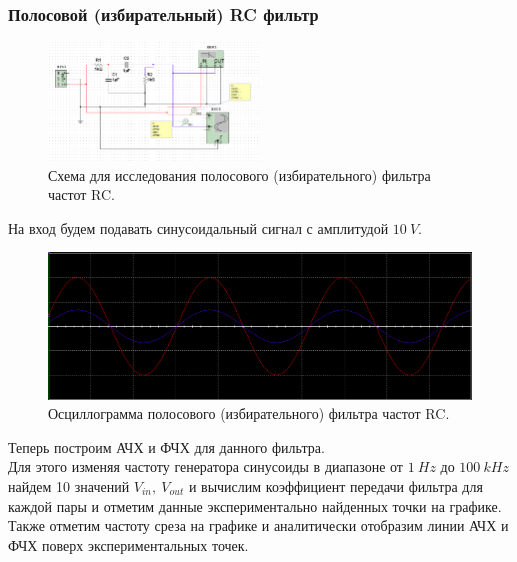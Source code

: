 \documentclass[12pt]{article}
\begin{document}
\subsubsection*{Полосовой (избирательный) RC фильтр}
\begin{figure}[H]
    \centering
    \includegraphics[width=0.5\textwidth]{3_scheme.png}
    \caption{Схема для исследования полосового (избирательного) фильтра частот RC.}
    \label{fig:3_scheme}
\end{figure}

На вход будем подавать синусоидальный сигнал с амплитудой $10 \ V$. \\

\begin{figure}[H]
    \centering
    \includegraphics[width=\textwidth]{3_osc.png}
    \caption{Осциллограмма полосового (избирательного) фильтра частот RC.}
    \label{fig:3_osc}
\end{figure}

Теперь построим АЧХ и ФЧХ для данного фильтра. \\
Для этого изменяя частоту генератора синусоиды в диапазоне от $1 \ Hz$ до $100 \ kHz$ найдем 10 значений $V_{in}, \ V_{out}$ и вычислим коэффициент передачи фильтра для каждой пары и отметим данные экспериментально найденных точки на графике. \\
Также отметим частоту среза на графике и аналитически отобразим линии АЧХ и ФЧХ поверх экспериментальных точек.
\end{document}
